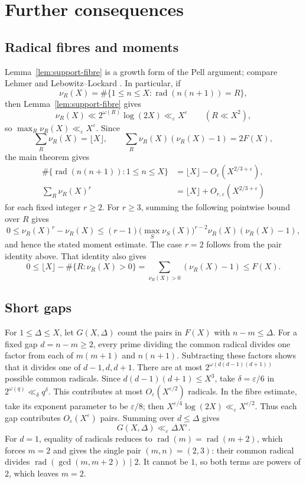 \section{Further consequences}\label{sec:consequences}

\subsection{Radical fibres and moments}
\begin{remark}
Lemma~\ref{lem:support-fibre} is a growth form of the Pell argument; compare
Lehmer \cite[Theorem~1]{Lehmer1964} and Lebowitz--Lockard
\cite[Lemma~8]{LL2025}. In particular, if
\[
\nu_R(X)=\#\{1\le n\le X:\operatorname{rad}(n(n+1))=R\},
\]
then Lemma~\ref{lem:support-fibre} gives
\[
\nu_R(X)\ll 2^{\omega(R)}\log(2X)\ll_\varepsilon X^\varepsilon
\qquad(R\ll X^2),
\]
so $\max_R\nu_R(X)\ll_\varepsilon X^\varepsilon$. Since
\[
\sum_R\nu_R(X)=\lfloor X\rfloor,\qquad
\sum_R\nu_R(X)(\nu_R(X)-1)=2F(X),
\]
the main theorem gives
\[
\begin{aligned}
\#\{\operatorname{rad}(n(n+1)):1\le n\le X\}
&=\lfloor X\rfloor-O_\varepsilon(X^{2/3+\varepsilon}),\\
\sum_R\nu_R(X)^r
&=\lfloor X\rfloor+O_{r,\varepsilon}(X^{2/3+\varepsilon})
\end{aligned}
\]
for each fixed integer $r\ge2$. For $r\ge3$, summing the following
pointwise bound over $R$ gives
\[
0\le \nu_R(X)^r-\nu_R(X)
\le (r-1)\bigl(\max_S\nu_S(X)\bigr)^{r-2}
       \nu_R(X)(\nu_R(X)-1),
\]
and hence the stated moment estimate.
The case $r=2$ follows from the pair identity above. That identity also
gives
\[
0\le \lfloor X\rfloor-\#\{R:\nu_R(X)>0\}
=\sum_{\nu_R(X)>0}(\nu_R(X)-1)\le F(X).
\]
\end{remark}

\subsection{Short gaps}
\begin{remark}
For $1\le\Delta\le X$, let $G(X,\Delta)$ count the pairs in $F(X)$ with
$n-m\le\Delta$. For a fixed gap $d=n-m\ge2$, every prime dividing the
common radical divides one factor from each of $m(m+1)$ and $n(n+1)$.
Subtracting these factors shows that it divides one of $d-1,d,d+1$.
There are at most $2^{\omega(d(d-1)(d+1))}$ possible common radicals.
Since $d(d-1)(d+1)\le X^3$, take $\delta=\varepsilon/6$ in
$2^{\omega(q)}\ll_\delta q^\delta$. This contributes at most
$O_\varepsilon(X^{\varepsilon/2})$ radicals. In the fibre estimate, take
its exponent parameter to be $\varepsilon/8$; then
$X^{\varepsilon/4}\log(2X)\ll_\varepsilon X^{\varepsilon/2}$. Thus each
gap contributes $O_\varepsilon(X^\varepsilon)$ pairs. Summing over
$d\le\Delta$ gives
\[
G(X,\Delta)\ll_\varepsilon \Delta X^\varepsilon.
\]
For $d=1$, equality of radicals reduces to
$\operatorname{rad}(m)=\operatorname{rad}(m+2)$, which forces $m=2$ and
gives the single pair $(m,n)=(2,3)$: their common radical divides
$\operatorname{rad}(\gcd(m,m+2))\mid2$. It cannot be $1$, so both terms
are powers of $2$, which leaves $m=2$.
\end{remark}
